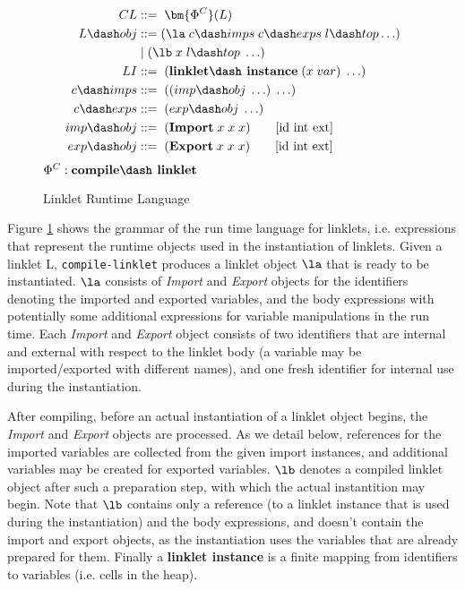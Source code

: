 \begin{figure}[h!]
  \begin{mdframed}
    \begin{align*}
      CL             &::=\; \bm{\Phi^C}(L)\\
      L\dash obj     &::= (\la\; c\dash imps \; c\dash exps \; l\dash top \ldots)\\
      \;           &\;|\; (\lb\; x\; l\dash top\; \ldots) \\
      LI             &::=\; (\textbf{linklet\dash instance}\; (x\; var)\; \ldots) \\
      c\dash imps    &::=\; ((imp\dash obj\; \ldots)\; \ldots)\\
      c\dash exps    &::=\; (exp\dash obj\; \ldots)\\
      imp\dash obj   &::=\; (\textbf{Import}\; x\; x\; x) \tag*{[id int ext]} \\
      exp\dash obj   &::=\; (\textbf{Export}\; x\; x\; x) \tag*{[id int ext]} \\
    \end{align*}
    \hfill \footnotesize $\Phi^C : \textbf{compile\dash linklet}$
    \caption{Linklet Runtime Language}
    \label{fig:linklet-runtime}
  \end{mdframed}
\end{figure}

Figure \ref{fig:linklet-runtime} shows the grammar of the run\dash
time language for linklets, i.e. expressions that represent the
run\dash time objects used in the instantiation of linklets. Given a
linklet L, \verb|compile-linklet| produces a linklet object $\la$ that
is ready to be instantiated. $\la$ consists of \textit{Import} and
\textit{Export} objects for the identifiers denoting the imported and
exported variables, and the body expressions with potentially some
additional expressions for variable manipulations in the run\dash
time. Each \textit{Import} and \textit{Export} object consists of two
identifiers that are internal and external with respect to the linklet
body (a variable may be imported/exported with different names), and
one fresh identifier for internal use during the instantiation.

After compiling, before an actual instantiation of a linklet object
begins, the \textit{Import} and \textit{Export} objects are
processed. As we detail below, references for the imported variables
are collected from the given import instances, and additional
variables may be created for exported variables. $\lb$ denotes a
compiled linklet object after such a preparation step, with which the
actual instantition may begin. Note that $\lb$ contains only a
reference (to a linklet instance that is used during the
instantiation) and the body expressions, and doesn't contain the
import and export objects, as the instantiation uses the variables
that are already prepared for them. Finally a \textbf{linklet\dash
  instance} is a finite mapping from identifiers to variables
(i.e. cells in the heap).

